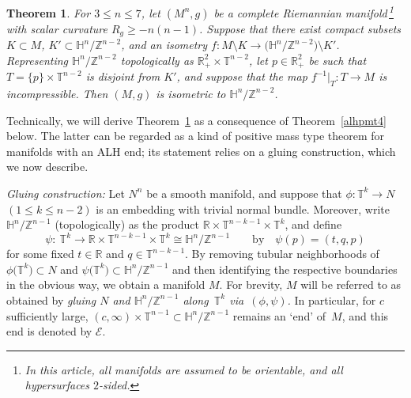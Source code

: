 \documentclass[10pt,a4paper]{amsart}
\numberwithin{equation}{section}
\newtheorem{Theorem}{Theorem}[section]
\def\R{\mathbb{R}}
\def\H{\mathbb{H}}
\def\T{\mathbb{T}}
\def\Z{\mathbb{Z}}
\def\Ecal{\mathcal{E}}
\begin{document}
\begin{Theorem}\label{deform1}
For $3\leq n\leq 7$, let $(M^n,g)$ be a complete Riemannian manifold\,\footnote{In this article,
all manifolds are assumed to be orientable, and all hypersurfaces $2$-sided.}
with  scalar curvature $R_g\geq-n(n-1)$. Suppose that there exist compact subsets $K\subset M$, $K'\subset \H^n/\Z^{n-2}$, and an isometry $f\colon M\setminus K\rightarrow \bigl(\mathbb{H}^n/\mathbb{Z}^{n-2}\bigr)\setminus K'$. Representing $\H^{n}/\Z^{n-2}$ topologically as $\R^2_+\times \T^{n-2}$, let $p\in \R^2_+$ be such that
$T = \{p\}\times \T^{n-2}$ is disjoint from $K'$, and suppose that the map $f^{-1}|_T\colon T\rightarrow M$ is incompressible.
Then $(M,g)$ is isometric to $\mathbb{H}^n/\mathbb{Z}^{n-2}$.
\end{Theorem}

Technically, we will derive Theorem~\ref{deform1}
as a consequence of Theorem~\ref{alhpmt4} below. The latter can be regarded as a kind of positive mass type theorem for manifolds with an ALH end; its
 statement relies on a gluing construction, which we now describe.

\emph{Gluing construction:} Let $N^n$ be a smooth manifold, and
suppose that $\phi\colon \T^k\rightarrow N$ $(1\le k\le n-2)$ is an embedding with trivial normal bundle.
Moreover, write
$\H^n/\Z^{n-1}$ (topologically) as the product $\R\times \T^{n-k-1}\times \T^k$,
and define
\[
	\psi\colon \ \T^k\rightarrow \R\times \T^{n-k-1}\times \T^k  \cong \H^n/\Z^{n-1}
	\qquad
	\mbox{by}
	\quad \psi(p) = (t,q,p)
\]
for some fixed $t\in \R$ and $q\in \T^{n-k-1}$.
By removing tubular neighborhoods of $\phi\bigl(\T^k\bigr)\subset N$ and $\psi\bigl(\T^k\bigr)\subset \H^{n}/\Z^{n-1}$
and then identifying the respective boundaries in the obvious way, we obtain
a manifold $M$. For brevity, $M$ will be referred to as obtained by \emph{gluing
$N$ and $\H^n/\Z^{n-1}$ along~$\T^k$ via~$(\phi,\psi)$.} In particular, for $c$ sufficiently large,
$(c,\infty)\times \T^{n-1}\subset \H^n/\Z^{n-1}$ remains an `end' of~$M$,
and this end is denoted by $\Ecal$.
\end{document}
